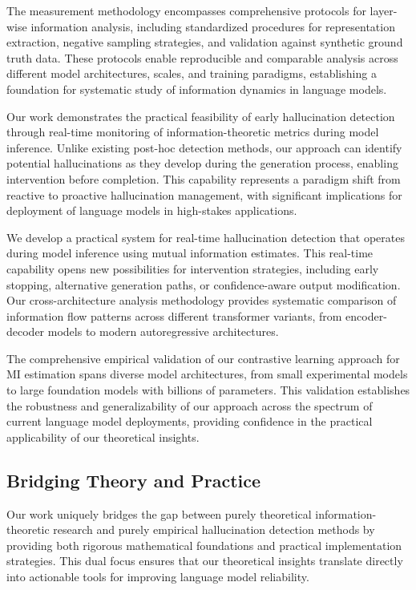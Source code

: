 The measurement methodology encompasses comprehensive protocols for layer-wise information analysis, including standardized procedures for representation extraction, negative sampling strategies, and validation against synthetic ground truth data. These protocols enable reproducible and comparable analysis across different model architectures, scales, and training paradigms, establishing a foundation for systematic study of information dynamics in language models.

Our work demonstrates the practical feasibility of early hallucination detection through real-time monitoring of information-theoretic metrics during model inference. Unlike existing post-hoc detection methods, our approach can identify potential hallucinations as they develop during the generation process, enabling intervention before completion. This capability represents a paradigm shift from reactive to proactive hallucination management, with significant implications for deployment of language models in high-stakes applications.

We develop a practical system for real-time hallucination detection that operates during model inference using mutual information estimates. This real-time capability opens new possibilities for intervention strategies, including early stopping, alternative generation paths, or confidence-aware output modification. Our cross-architecture analysis methodology provides systematic comparison of information flow patterns across different transformer variants, from encoder-decoder models to modern autoregressive architectures.

The comprehensive empirical validation of our contrastive learning approach for MI estimation spans diverse model architectures, from small experimental models to large foundation models with billions of parameters. This validation establishes the robustness and generalizability of our approach across the spectrum of current language model deployments, providing confidence in the practical applicability of our theoretical insights.

\subsection{Bridging Theory and Practice}

Our work uniquely bridges the gap between purely theoretical information-theoretic research and purely empirical hallucination detection methods by providing both rigorous mathematical foundations and practical implementation strategies. This dual focus ensures that our theoretical insights translate directly into actionable tools for improving language model reliability.

